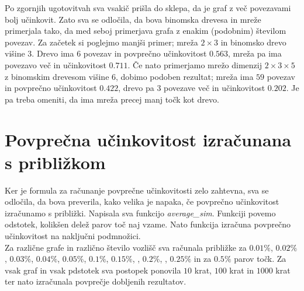 \documentclass[a4paper, 16pt]{article}
\begin{document}
    Po zgornjih ugotovitvah sva vsakič prišla do sklepa, da je graf z več povezavami bolj učinkovit. Zato sva se odločila, da bova binomska drevesa
    in mreže primerjala tako, da med seboj primerjava grafa z enakim (podobnim) številom povezav. Za začetek si poglejmo manjši primer; mreža 
    $2 \times 3$ in binomsko drevo višine $3$. Drevo ima $6$ povezav in povprečno učinkovitost $0.563$, mreža pa ima povezavo več in učinkovitost $0.711$.
    Če nato primerjamo mrežo dimenzij $2 \times 3 \times 5$ z binomskim drevesom višine $6$, dobimo podoben rezultat; mreža ima $59$ povezav in 
    povprečno učinkovitost $0.422$, drevo pa $3$ povezave več in učinkovitost $0.202$. Je pa treba omeniti, da ima mreža precej manj točk kot drevo.
    



\section{Povprečna učinkovitost izračunana s približkom}
Ker je formula za računanje povprečne učinkovitosti zelo zahtevna, sva se odločila, da bova preverila, kako velika je napaka,
če povprečno učinkovitost izračunamo s približki.
Napisala sva funkcijo \emph{average\_sim}. Funkciji povemo odstotek, kolikšen delež parov toč naj vzame.
Nato funkcija izračuna povprečno učinkovitost na naključni podmnožici. \\
Za različne grafe in različno število vozlišč sva računala približke za $0.01 \%$, $0.02 \%$, $0.03 \%$, $0.04 \%$, $0.05 \%$, $0.1 \%$, $0.15 \%$, , $0.2 \%$, , $0.25 \%$ in za $0.5 \%$ parov točk.
Za vsak graf in vsak pdstotek sva postopek ponovila $10$ krat, $100$ krat in $1000$ krat ter nato izračunala povprečje dobljenih rezultatov.


\newpage
\end{document}
